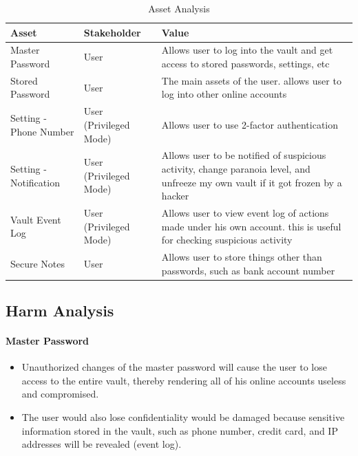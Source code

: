 \documentclass{article}
\begin{document}
\begin{table}[H]
  \centering
  \begin{tabular}{>{\centering}m{3cm} >{\centering}m{4cm} >{\centering\arraybackslash}m{8cm}}
    \toprule
    Asset & Stakeholder & Value \\
    \midrule
    Master Password & User & Allows user to log into the vault and get access to stored passwords, settings, etc \\
    Stored Password & User & The main assets of the user. allows user to log into other online accounts \\
    Setting - Phone Number & User (Privileged Mode) & Allows user to use 2-factor authentication \\
    Setting - Notification & User (Privileged Mode) & Allows user to be notified of suspicious activity, change paranoia level, and unfreeze my own vault if it got frozen by a hacker \\
    Vault Event Log & User (Privileged Mode) & Allows user to view event log of actions made under his own account. this is useful for checking suspicious activity \\
    Secure Notes & User & Allows user to store things other than passwords, such as bank account number \\
    \bottomrule
  \end{tabular}
  \caption{Asset Analysis}
  \label{fig:asset_analysis}
\end{table}


\subsection{Harm Analysis}
\label{sub:harm_analysis}

\paragraph{Master Password}
\label{par:master_password}
\begin{itemize}
  \item Unauthorized changes of the master password will cause the user to lose access to the entire vault, thereby rendering all of his online accounts useless and compromised.
  \item The user would also lose confidentiality would be damaged because sensitive information stored in the vault, such as phone number, credit card, and IP addresses will be revealed (event log).
\end{itemize}
\end{document}
